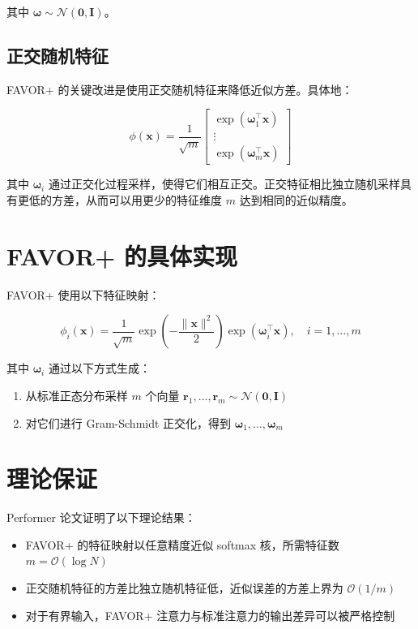 其中 $\boldsymbol{\omega} \sim \mathcal{N}(\mathbf{0}, \mathbf{I})$。

\subsection{正交随机特征}

FAVOR+ 的关键改进是使用正交随机特征来降低近似方差。具体地：

\begin{equation}
    \phi(\mathbf{x}) = \frac{1}{\sqrt{m}} \begin{bmatrix}
        \exp(\boldsymbol{\omega}_1^\top \mathbf{x}) \\
        \vdots \\
        \exp(\boldsymbol{\omega}_m^\top \mathbf{x})
    \end{bmatrix}
\end{equation}

其中 $\boldsymbol{\omega}_i$ 通过正交化过程采样，使得它们相互正交。正交特征相比独立随机采样具有更低的方差，从而可以用更少的特征维度 $m$ 达到相同的近似精度。

\section{FAVOR+ 的具体实现}

FAVOR+ 使用以下特征映射：

\begin{equation}
    \phi_i(\mathbf{x}) = \frac{1}{\sqrt{m}} \exp\left(-\frac{\|\mathbf{x}\|^2}{2}\right) \exp(\boldsymbol{\omega}_i^\top \mathbf{x}), \quad i = 1, \ldots, m
\end{equation}

其中 $\boldsymbol{\omega}_i$ 通过以下方式生成：

\begin{enumerate}
    \item 从标准正态分布采样 $m$ 个向量 $\mathbf{r}_1, \ldots, \mathbf{r}_m \sim \mathcal{N}(\mathbf{0}, \mathbf{I})$
    \item 对它们进行 Gram-Schmidt 正交化，得到 $\boldsymbol{\omega}_1, \ldots, \boldsymbol{\omega}_m$
\end{enumerate}

\section{理论保证}

Performer 论文证明了以下理论结果：

\begin{itemize}
    \item FAVOR+ 的特征映射以任意精度近似 softmax 核，所需特征数 $m = \mathcal{O}(\log N)$
    \item 正交随机特征的方差比独立随机特征低，近似误差的方差上界为 $\mathcal{O}(1/m)$
    \item 对于有界输入，FAVOR+ 注意力与标准注意力的输出差异可以被严格控制
\end{itemize}

